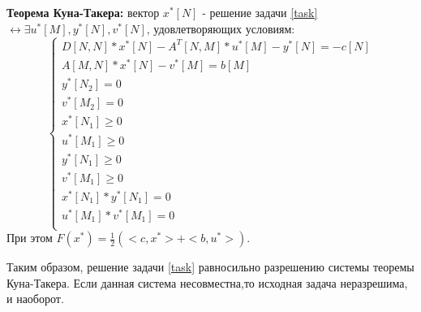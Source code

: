 \textbf{Теорема Куна-Такера:} вектор $x^*[N]$ - решение задачи \eqref{task} $\leftrightarrow \exists u^*[M],y^*[N],v^*[N]$, удовлетворяющих условиям:
\begin{equation}
    \left\{
    \begin{array}{ll}
        D[N,N]*x^*[N]-A^T[N,M]*u^*[M]-y^*[N]=-c[N]\\
        A[M,N]*x^*[N]-v^*[M]=b[M]\\
        y^*[N_2]=0\\
        v^*[M_2]=0\\
        x^*[N_1]\geq0\\
        u^*[M_1]\geq0\\
        y^*[N_1]\geq0\\
        v^*[M_1]\geq0\\
        x^*[N_1]*y^*[N_1]=0\\
        u^*[M_1]*v^*[M_1]=0\\
    \end{array}
    \right.
\end{equation}
При этом $F(x^*)=\frac{1}{2}(<c,x^*>+<b,u^*>)$.

Таким образом, решение задачи \eqref{task} равносильно разрешению системы теоремы Куна-Такера. Если данная система несовместна,то исходная задача неразрешима, и наоборот.

